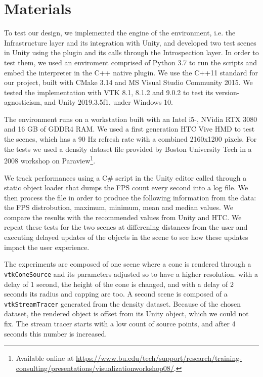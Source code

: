 \chapter{Materials}
\label{ch:materials}

To test our design, we implemented the engine of the environment, i.e. the Infrastructure layer and its integration with Unity, and developed two test scenes in Unity using the plugin and its calls through the Introspection layer. In order to test them, we used an enviroment comprised of Python 3.7 to run the scripts and embed the interpreter in the C++ native plugin. We use the C++11 standard for our project, built with CMake 3.14 and MS Visual Studio Community 2015. We tested the implementation with VTK 8.1, 8.1.2 and 9.0.2 to test its version-agnosticism, and Unity 2019.3.5f1, under Windows 10.

The environment runs on a workstation built with an Intel i5-, NVidia RTX 3080 and 16 GB of GDDR4 RAM. We used a first generation HTC Vive HMD to test the scenes, which has a 90 Hz refresh rate with a combined 2160x1200 pixels. For the tests we used a density dataset file provided by Boston University Tech in a 2008 workshop on Paraview\footnote{Available online at \url{https://www.bu.edu/tech/support/research/training-consulting/presentations/visualizationworkshop08/}.}. 

We track performances using a C\# script in the Unity editor called through a static object loader that dumps the FPS count every second into a log file. We then process the file in order to produce the following information from the data: the FPS distrobution, maximum, minimum, mean and median values. We compare the results with the recommended values from Unity and HTC. We repeat these tests for the two scenes at differening distances from the user and executing delayed updates of the objects in the scene to see how these updates impact the user experience.

The experiments are composed of one scene where a cone is rendered through a \verb|vtkConeSource| and its parameters adjusted so to have a higher resolution. with a delay of 1 second, the height of the cone is changed, and with a delay of 2 seconds its radius and capping are too. A second scene is composed of a \verb|vtkStreamTracer| generated from the density dataset. Because of the chosen dataset, the rendered object is offset from its Unity object, which we could not fix. The stream tracer starts with a low count of source points, and after 4 seconds this number is increased.